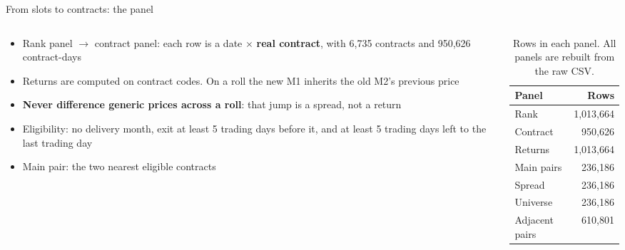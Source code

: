 \documentclass[10pt, aspectratio=169]{beamer}
\newcommand{\key}[1]{\textcolor{accent}{\textbf{#1}}}
\begin{document}
\begin{frame}{From slots to contracts: the panel}
\begin{columns}[c, onlytextwidth]
\begin{column}{0.55\textwidth}
\footnotesize
\begin{itemize}
  \item Rank panel $\rightarrow$ contract panel: each row is a date $\times$
        \key{real contract}, with 6{,}735 contracts and 950{,}626 contract-days
  \item Returns are computed on contract codes. On a roll the new M1 inherits
        the old M2's previous price
  \item \key{Never difference generic prices across a roll}: that jump is a
        spread, not a return
  \item Eligibility: no delivery month, exit at least 5 trading days before it,
        and at least 5 trading days left to the last trading day
  \item Main pair: the two nearest eligible contracts
\end{itemize}
\end{column}
\begin{column}{0.42\textwidth}
\begin{table}
\centering
\scriptsize
\setlength{\tabcolsep}{3pt}
\begin{tabular}{@{}l r@{}}
\toprule
Panel & Rows \\
\midrule
Rank                & 1{,}013{,}664 \\
Contract            & 950{,}626 \\
Returns             & 1{,}013{,}664 \\
Main pairs          & 236{,}186 \\
Spread              & 236{,}186 \\
Universe            & 236{,}186 \\
Adjacent pairs      & 610{,}801 \\
\bottomrule
\end{tabular}
\caption{Rows in each panel. All panels are rebuilt from the raw CSV.}
\end{table}
\end{column}
\end{columns}
\end{frame}
\end{document}
